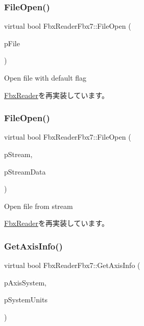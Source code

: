 \subsubsection{\texorpdfstring{File\+Open()}{FileOpen()}\hspace{0.1cm}{\footnotesize\ttfamily [3/4]}}
{\footnotesize\ttfamily virtual bool Fbx\+Reader\+Fbx7\+::\+File\+Open (\begin{DoxyParamCaption}\item[{\hyperlink{class_fbx_file}{Fbx\+File} $\ast$}]{p\+File }\end{DoxyParamCaption})\hspace{0.3cm}{\ttfamily [virtual]}}

Open file with default flag 

\hyperlink{class_fbx_reader_a9e334ad0c2abd069c35a016413a8adcd}{Fbx\+Reader}を再実装しています。

\mbox{\label{class_fbx_reader_fbx7_a3ae495d359793c9389f02a1ed1e435ff}} 
\subsubsection{\texorpdfstring{File\+Open()}{FileOpen()}\hspace{0.1cm}{\footnotesize\ttfamily [4/4]}}
{\footnotesize\ttfamily virtual bool Fbx\+Reader\+Fbx7\+::\+File\+Open (\begin{DoxyParamCaption}\item[{\hyperlink{class_fbx_stream}{Fbx\+Stream} $\ast$}]{p\+Stream,  }\item[{void $\ast$}]{p\+Stream\+Data }\end{DoxyParamCaption})\hspace{0.3cm}{\ttfamily [virtual]}}

Open file from stream 

\hyperlink{class_fbx_reader_a819487a39b5e25f69a8dccf187ab4ab9}{Fbx\+Reader}を再実装しています。

\mbox{\label{class_fbx_reader_fbx7_aa57c715aa82bd42dbe1df860296ad8be}} 
\subsubsection{\texorpdfstring{Get\+Axis\+Info()}{GetAxisInfo()}}
{\footnotesize\ttfamily virtual bool Fbx\+Reader\+Fbx7\+::\+Get\+Axis\+Info (\begin{DoxyParamCaption}\item[{\hyperlink{class_fbx_axis_system}{Fbx\+Axis\+System} $\ast$}]{p\+Axis\+System,  }\item[{\hyperlink{class_fbx_system_unit}{Fbx\+System\+Unit} $\ast$}]{p\+System\+Units }\end{DoxyParamCaption})\hspace{0.3cm}{\ttfamily [virtual]}}


